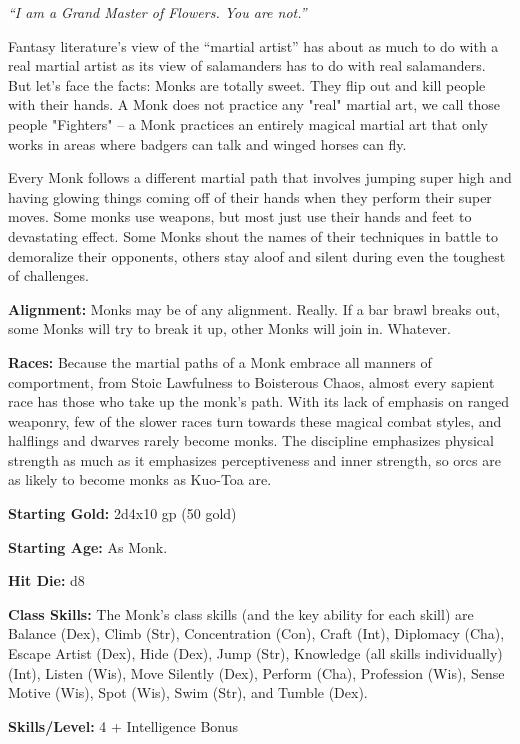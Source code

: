 \documentclass[10pt]{article}
\newcommand{\ability}[2]{\smallskip \noindent \textbf{#1} #2}
\newcommand{\classname}[1]{\noindent{\huge \textbf{#1}}}
\newcommand{\quot}[1]{\emph{#1}\medskip}
\newcommand{\desc}[1]{#1 \medskip}
\begin{document}
\newpage


\classname{Monk}

\quot{``I am a Grand Master of Flowers. You are not.''}

\desc{Fantasy literature's view of the ``martial artist'' has about as much to do with a real martial artist as its view of salamanders has to do with real salamanders. But let's face the facts: Monks are totally sweet. They flip out and kill people with their hands. A Monk does not practice any "real" martial art, we call those people "Fighters" -- a Monk practices an entirely magical martial art that only works in areas where badgers can talk and winged horses can fly.}

\desc{Every Monk follows a different martial path that involves jumping super high and having glowing things coming off of their hands when they perform their super moves. Some monks use weapons, but most just use their hands and feet to devastating effect. Some Monks shout the names of their techniques in battle to demoralize their opponents, others stay aloof and silent during even the toughest of challenges.}

\ability{Alignment:}{Monks may be of any alignment. Really. If a bar brawl breaks out, some Monks will try to break it up, other Monks will join in. Whatever.}

\ability{Races:}{Because the martial paths of a Monk embrace all manners of comportment, from Stoic Lawfulness to Boisterous Chaos, almost every sapient race has those who take up the monk's path. With its lack of emphasis on ranged weaponry, few of the slower races turn towards these magical combat styles, and halflings and dwarves rarely become monks. The discipline emphasizes physical strength as much as it emphasizes perceptiveness and inner strength, so orcs are as likely to become monks as Kuo-Toa are.}

\ability{Starting Gold:}{2d4x10 gp (50 gold)}

\ability{Starting Age:}{As Monk.}

\ability{Hit Die:}{d8}

\ability{Class Skills:}{The Monk's class skills (and the key ability for each skill) are Balance (Dex), Climb (Str), Concentration (Con), Craft (Int), Diplomacy (Cha), Escape Artist (Dex), Hide (Dex), Jump (Str), Knowledge (all skills individually) (Int), Listen (Wis), Move Silently (Dex), Perform (Cha), Profession (Wis), Sense Motive (Wis), Spot (Wis), Swim (Str), and Tumble (Dex).}

\ability{Skills/Level:}{4 + Intelligence Bonus}
\end{document}
